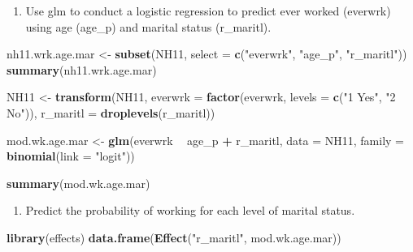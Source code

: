 \documentclass[]{book}
\newenvironment{Shaded}{\begin{snugshade}}{\end{snugshade}}
\newcommand{\KeywordTok}[1]{\textcolor[rgb]{0.13,0.29,0.53}{\textbf{#1}}}
\newcommand{\DataTypeTok}[1]{\textcolor[rgb]{0.13,0.29,0.53}{#1}}
\newcommand{\StringTok}[1]{\textcolor[rgb]{0.31,0.60,0.02}{#1}}
\newcommand{\OperatorTok}[1]{\textcolor[rgb]{0.81,0.36,0.00}{\textbf{#1}}}
\newcommand{\NormalTok}[1]{#1}
\providecommand{\tightlist}{%
  \setlength{\itemsep}{0pt}\setlength{\parskip}{0pt}}
\begin{document}
\begin{enumerate}
\def\labelenumi{\arabic{enumi}.}
\tightlist
\item
  Use glm to conduct a logistic regression to predict ever worked
  (everwrk) using age (age\_p) and marital status (r\_maritl).
\end{enumerate}

\begin{Shaded}
\begin{Highlighting}[]
\NormalTok{  nh11.wrk.age.mar <-}\StringTok{ }\KeywordTok{subset}\NormalTok{(NH11, }\DataTypeTok{select =} \KeywordTok{c}\NormalTok{(}\StringTok{"everwrk"}\NormalTok{, }\StringTok{"age_p"}\NormalTok{, }\StringTok{"r_maritl"}\NormalTok{))}
  \KeywordTok{summary}\NormalTok{(nh11.wrk.age.mar)}

\NormalTok{  NH11 <-}\StringTok{ }\KeywordTok{transform}\NormalTok{(NH11,}
                    \DataTypeTok{everwrk =} \KeywordTok{factor}\NormalTok{(everwrk, }\DataTypeTok{levels =} \KeywordTok{c}\NormalTok{(}\StringTok{"1 Yes"}\NormalTok{, }\StringTok{"2 No"}\NormalTok{)),}
                    \DataTypeTok{r_maritl =} \KeywordTok{droplevels}\NormalTok{(r_maritl))}

\NormalTok{  mod.wk.age.mar <-}\StringTok{ }\KeywordTok{glm}\NormalTok{(everwrk }\OperatorTok{~}\StringTok{ }\NormalTok{age_p }\OperatorTok{+}\StringTok{ }\NormalTok{r_maritl, }\DataTypeTok{data =}\NormalTok{ NH11,}
                        \DataTypeTok{family =} \KeywordTok{binomial}\NormalTok{(}\DataTypeTok{link =} \StringTok{"logit"}\NormalTok{))}

  \KeywordTok{summary}\NormalTok{(mod.wk.age.mar)}
\end{Highlighting}
\end{Shaded}

\begin{enumerate}
\def\labelenumi{\arabic{enumi}.}
\setcounter{enumi}{1}
\tightlist
\item
  Predict the probability of working for each level of marital status.
\end{enumerate}

\begin{Shaded}
\begin{Highlighting}[]
  \KeywordTok{library}\NormalTok{(effects)}
  \KeywordTok{data.frame}\NormalTok{(}\KeywordTok{Effect}\NormalTok{(}\StringTok{"r_maritl"}\NormalTok{, mod.wk.age.mar))}
\end{Highlighting}
\end{Shaded}
\end{document}

